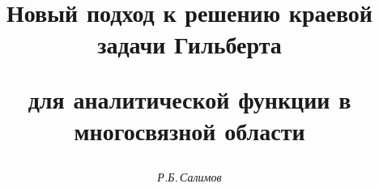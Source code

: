 

 




 


\newcommand{\re}{\operatorname{Re}} 


\newcommand{\im}{\operatorname{Im}} 


\newcommand{\tts}[1]{} 


 




\setcounter{page}{60} 












 


\author{\it Р.Б.\,Салимов} 




\title{Новый подход к решению краевой задачи Гильберта  


для аналитической функции в многосвязной области} 


 


\date{} 




\pagestyle{plain} %


 




\maketitle 


